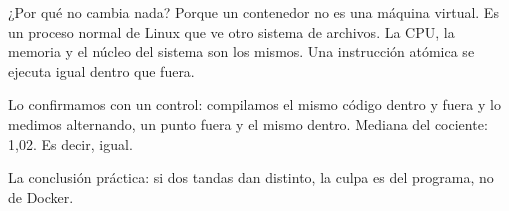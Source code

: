 ¿Por qué no cambia nada? Porque un contenedor no es una máquina virtual. Es un proceso normal de Linux que ve otro sistema de archivos. La CPU, la memoria y el núcleo del sistema son los mismos. Una instrucción atómica se ejecuta igual dentro que fuera.

Lo confirmamos con un control: compilamos el mismo código dentro y fuera y lo medimos alternando, un punto fuera y el mismo dentro. Mediana del cociente: 1,02. Es decir, igual.

La conclusión práctica: si dos tandas dan distinto, la culpa es del programa, no de Docker.
